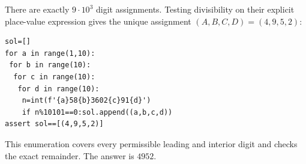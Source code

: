 There are exactly $ 9\cdot10^3 $ digit assignments. Testing divisibility on their explicit place-value expression gives the unique assignment $(A,B,C,D)=(4,9,5,2)$:
\begin{verbatim}
sol=[]
for a in range(1,10):
 for b in range(10):
  for c in range(10):
   for d in range(10):
    n=int(f'{a}58{b}3602{c}91{d}')
    if n%10101==0:sol.append((a,b,c,d))
assert sol==[(4,9,5,2)]
\end{verbatim}
This enumeration covers every permissible leading and interior digit and checks the exact remainder. The answer is $\boxed{4952}$.
